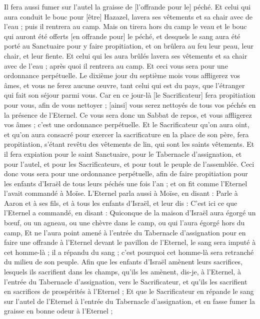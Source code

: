 \begin{multicols}{2}
Il fera aussi fumer sur l'autel la graisse de [l'offrande pour le] péché.
Et celui qui aura conduit le bouc pour [être] Hazazel, lavera ses vêtements et sa chair avec de l'eau ; puis il rentrera au camp.
Mais on tirera hors du camp le veau et le bouc qui auront été offerts [en offrande pour] le péché, et desquels le sang aura été porté au Sanctuaire pour y faire propitiation, et on brûlera au feu leur peau, leur chair, et leur fiente.
Et celui qui les aura brûlés lavera ses vêtements et sa chair avec de l'eau ; après quoi il rentrera au camp.
Et ceci vous sera pour une ordonnance perpétuelle. Le dixième jour du septième mois vous affligerez vos âmes, et vous ne ferez aucune œuvre, tant celui qui est du pays, que l'étranger qui fait son séjour parmi vous.
Car en ce jour-là [le Sacrificateur] fera propitiation pour vous, afin de vous nettoyer ; [ainsi] vous serez nettoyés de tous vos péchés en la présence de l'Eternel.
Ce vous sera donc un Sabbat de repos, et vous affligerez vos âmes ; c'est une ordonnance perpétuelle.
Et le Sacrificateur qu'on aura oint, et qu'on aura consacré pour exercer la sacrificature en la place de son père, fera propitiation, s'étant revêtu des vêtements de lin, qui sont les saints vêtements.
Et il fera expiation pour le saint Sanctuaire, pour le Tabernacle d'assignation, et pour l'autel, et pour les Sacrificateurs, et pour tout le peuple de l'assemblée.
Ceci donc vous sera pour une ordonnance perpétuelle, afin de faire propitiation pour les enfants d'Israël de tous leurs péchés une fois l'an ; et on fit comme l'Eternel l'avait commandé à Moïse.
\VerseOne{}L'Eternel parla aussi à Moïse, en disant :
Parle à Aaron et à ses fils, et à tous les enfants d'Israël, et leur dis : C'est ici ce que l'Eternel a commandé, en disant :
Quiconque de la maison d'Israël aura égorgé un bœuf, ou un agneau, ou une chèvre dans le camp, ou qui l'aura égorgé hors du camp,
Et ne l'aura point amené à l'entrée du Tabernacle d'assignation pour en faire une offrande à l'Eternel devant le pavillon de l'Eternel, le sang sera imputé à cet homme-là ; il a répandu du sang ; c'est pourquoi cet homme-là sera retranché du milieu de son peuple.
Afin que les enfants d'Israël amènent leurs sacrifices, lesquels ils sacrifient dans les champs, qu'ils les amènent, dis-je, à l'Eternel, à l'entrée du Tabernacle d'assignation, vers le Sacrificateur, et qu'ils les sacrifient en sacrifices de prospérités à l'Eternel ;
Et que le Sacrificateur en répande le sang sur l'autel de l'Eternel à l'entrée du Tabernacle d'assignation, et en fasse fumer la graisse en bonne odeur à l'Eternel ;

\end{multicols}
